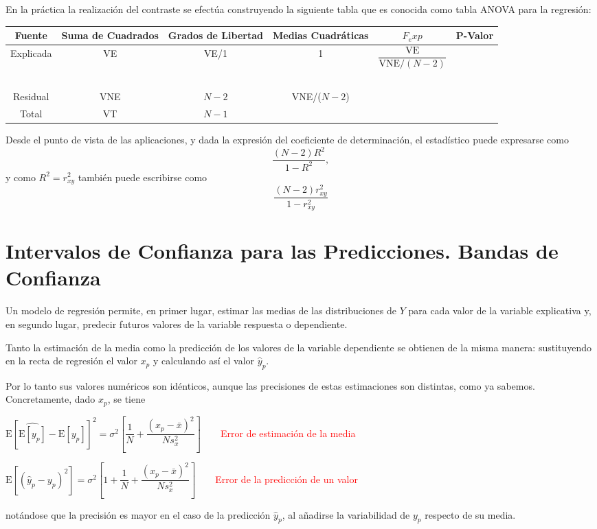 \documentclass[10pt,a4paper]{book}
\begin{document}
En la práctica la realización del contraste se efectúa construyendo la siguiente tabla que es conocida como tabla ANOVA para la regresión:
\begin{table}
\begin{tabular}{|c|c|c|c|c|c|c|}
\hline 
Fuente & Suma de Cuadrados & Grados de Libertad & Medias Cuadráticas & \multicolumn{2}{|c|}{$F_exp$} & P-Valor \\ 
\hline 
\multirow{2}{1.5cm}{Explicada} & \multirow{2}{0.5cm}{VE} & \multirow{2}{0.7cm}{VE/1} & \multirow{2}{0.5cm}{1} & \multicolumn{2}{|c|}{$\dfrac{\mathrm{VE}}{\mathrm{VNE}/(N-2)}$} &  \\
 & & & & \multicolumn{2}{|c|}{\ } & \\
Residual & VNE & $N-2$ & VNE/($N-2$) & \multicolumn{2}{|c|}{\ } &  \\ 
Total & VT & $N-1$ &  & \multicolumn{2}{|c|}{\ } &  \\ 
\hline 
\end{tabular} 
\end{table}

Desde el punto de vista de las aplicaciones, y dada la expresión del coeficiente de determinación, el estadístico puede expresarse como 
$$\dfrac{(N-2)R^2}{1-R^2},$$
y como $R^2=r^2_{xy}$ también puede escribirse como 
$$\dfrac{(N-2)r^2_{xy}}{1-r^2_{xy}}$$
	\section{Intervalos de Confianza para las Predicciones. Bandas de Confianza}
Un modelo de regresión permite, en primer lugar, estimar las medias de las distribuciones de $Y$ para cada valor de la variable explicativa y, en segundo lugar, predecir futuros valores de la variable respuesta o dependiente.

Tanto la estimación de la media como la predicción de los valores de la variable dependiente se obtienen de la misma manera: sustituyendo en la recta de regresión el valor $x_p$ y calculando así el valor $\widehat{y}_p$.

Por lo tanto sus valores numéricos son idénticos, aunque las precisiones de estas estimaciones son distintas, como ya sabemos. Concretamente, dado $x_p$, se tiene
\begin{center}
$\mathrm{E}\left[\widehat{\mathrm{E}[y_p]}-\mathrm{E}[y_p]\right]^2=\sigma^2\left[\dfrac{1}{N}+\dfrac{(x_p-\bar{x})^2}{Ns^2_x}\right]\qquad$\textcolor{red}{Error de estimación de la media}
\end{center}
\begin{center}
$\mathrm{E}[(\widehat{y}_p-y_p)^2]=\sigma^2\left[1+\dfrac{1}{N}+\dfrac{(x_p-\bar{x})^2}{Ns^2_x}\right]\qquad$\textcolor{red}{Error de la predicción de un valor}
\end{center}
notándose que la precisión es mayor en el caso de la predicción $\widehat{y}_p$, al añadirse la variabilidad de $y_p$ respecto de su media.
\end{document}
